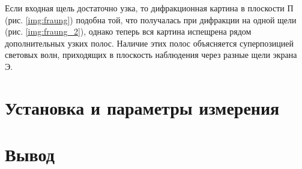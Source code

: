 \documentclass{letask}
\begin{document}
Если входная щель достаточно узка, то дифракционная картина в плоскости П (рис. \ref{img:fraung}) подобна той, что получалась при дифракции на одной щели (рис. \ref{img:fraung_2}), однако теперь вся картина испещрена рядом дополнительных узких полос. Наличие этих полос объясняется суперпозицией световых волн, приходящих в плоскость наблюдения через разные щели экрана Э.



\section{Установка и параметры измерения}

\section{Вывод}
\end{document}
